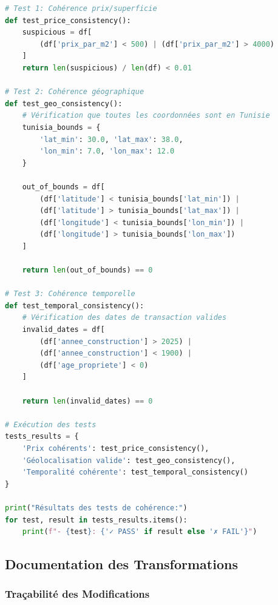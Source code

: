 \begin{lstlisting}[language=Python,caption=Tests de Cohérence]
# Test 1: Cohérence prix/superficie
def test_price_consistency():
    suspicious = df[
        (df['prix_par_m2'] < 500) | (df['prix_par_m2'] > 4000)
    ]
    return len(suspicious) / len(df) < 0.01

# Test 2: Cohérence géographique
def test_geo_consistency():
    # Vérification que toutes les coordonnées sont en Tunisie
    tunisia_bounds = {
        'lat_min': 30.0, 'lat_max': 38.0,
        'lon_min': 7.0, 'lon_max': 12.0
    }
    
    out_of_bounds = df[
        (df['latitude'] < tunisia_bounds['lat_min']) |
        (df['latitude'] > tunisia_bounds['lat_max']) |
        (df['longitude'] < tunisia_bounds['lon_min']) |
        (df['longitude'] > tunisia_bounds['lon_max'])
    ]
    
    return len(out_of_bounds) == 0

# Test 3: Cohérence temporelle
def test_temporal_consistency():
    # Vérification des dates de transaction valides
    invalid_dates = df[
        (df['annee_construction'] > 2025) |
        (df['annee_construction'] < 1900) |
        (df['age_propriete'] < 0)
    ]
    
    return len(invalid_dates) == 0

# Exécution des tests
tests_results = {
    'Prix cohérents': test_price_consistency(),
    'Géolocalisation valide': test_geo_consistency(),
    'Temporalité cohérente': test_temporal_consistency()
}

print("Résultats des tests de cohérence:")
for test, result in tests_results.items():
    print(f"- {test}: {'✓ PASS' if result else '✗ FAIL'}")
\end{lstlisting}

\subsection{Documentation des Transformations}
\label{subsec:documentation_transformations}

\subsubsection{Traçabilité des Modifications}

